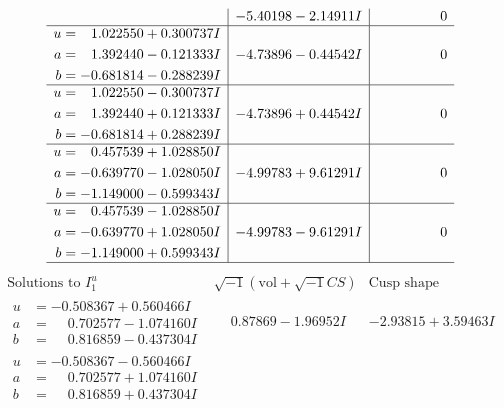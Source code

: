 \documentclass[1p]{elsarticle_modified}
\theoremstyle{definition}
\newcommand{\I}{\sqrt{-1}}
\begin{document}
$$\begin{array}{c|c|c}
 & -5.40198 - 2.14911 I & \phantom{-0.000000 } 0 \\ \hline\begin{aligned}
u &= \phantom{-}1.022550 + 0.300737 I \\
a &= \phantom{-}1.392440 - 0.121333 I \\
b &= -0.681814 - 0.288239 I\end{aligned}
 & -4.73896 - 0.44542 I & \phantom{-0.000000 } 0 \\ \hline\begin{aligned}
u &= \phantom{-}1.022550 - 0.300737 I \\
a &= \phantom{-}1.392440 + 0.121333 I \\
b &= -0.681814 + 0.288239 I\end{aligned}
 & -4.73896 + 0.44542 I & \phantom{-0.000000 } 0 \\ \hline\begin{aligned}
u &= \phantom{-}0.457539 + 1.028850 I \\
a &= -0.639770 - 1.028050 I \\
b &= -1.149000 - 0.599343 I\end{aligned}
 & -4.99783 + 9.61291 I & \phantom{-0.000000 } 0 \\ \hline\begin{aligned}
u &= \phantom{-}0.457539 - 1.028850 I \\
a &= -0.639770 + 1.028050 I \\
b &= -1.149000 + 0.599343 I\end{aligned}
 & -4.99783 - 9.61291 I & \phantom{-0.000000 } 0\\
 \hline 
 \end{array}$$\newpage$$\begin{array}{c|c|c}  
\text{Solutions to }I^u_{1}& \I (\text{vol} + \sqrt{-1}CS) & \text{Cusp shape}\\
 \hline 
\begin{aligned}
u &= -0.508367 + 0.560466 I \\
a &= \phantom{-}0.702577 - 1.074160 I \\
b &= \phantom{-}0.816859 - 0.437304 I\end{aligned}
 & \phantom{-}0.87869 - 1.96952 I & -2.93815 + 3.59463 I \\ \hline\begin{aligned}
u &= -0.508367 - 0.560466 I \\
a &= \phantom{-}0.702577 + 1.074160 I \\
b &= \phantom{-}0.816859 + 0.437304 I\end{aligned}

\end{array}$$
\end{document}
